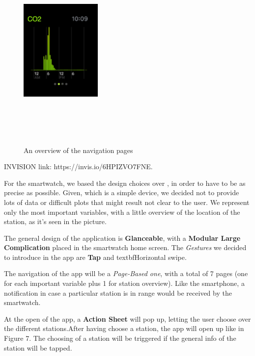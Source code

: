\documentclass[12pt]{article} %
\begin{document}
\begin{figure}[H]
  \includegraphics[width=4cm,height=10cm,keepaspectratio]{img/histoAW.png}
  \hfill
  \caption{An overview of the navigation pages}
  \label{fig:boat1}
\end{figure}
INVISION link: https://invis.io/6HPIZVO7FNE.

For the smartwatch, we based the design choices over \cite{apple}, in order to have to be as precise as possible.
Given, which is a simple device, we decided not to provide lots of data or difficult plots that might result not clear to the user.
We represent only the most important variables, with a little overview of the location of the station, as it's seen in the picture.

The general design of the application is \textbf{Glanceable}, with a \textbf{Modular Large Complication} placed in the smartwatch home screen.
The \textit{Gestures} we decided to introduce in the app are \textbf{Tap} and textbf{Horizontal swipe}.

The navigation of the app will be a \textit{Page-Based one}, with a total of 7 pages (one for each important variable plus 1 for station overview).
Like the smartphone, a notification in case a particular station is in range would be received by the smartwatch.

At the open of the app, a \textbf{Action Sheet} will pop up, letting the user choose over the different stations.After having choose a station, the app will open up like in Figure 7.
The choosing of a station will be triggered if the general info of the station will be tapped.
\end{document}
